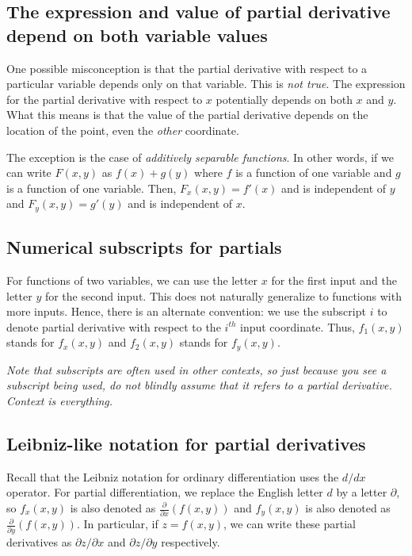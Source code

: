 \documentclass[10pt]{amsart}
\begin{document}
\subsection{The expression and value of partial derivative depend on both variable values}

One possible misconception is that the partial derivative with respect
to a particular variable depends only on that variable. This is {\em
not true}. The expression for the partial derivative with respect to
$x$ potentially depends on both $x$ and $y$. What this means is that
the value of the partial derivative depends on the location of the
point, even the {\em other} coordinate.

The exception is the case of {\em additively separable functions}. In
other words, if we can write $F(x,y)$ as $f(x) + g(y)$ where $f$ is a
function of one variable and $g$ is a function of one variable. Then,
$F_x(x,y) = f'(x)$ and is independent of $y$ and $F_y(x,y) = g'(y)$
and is independent of $x$.

\subsection{Numerical subscripts for partials}

For functions of two variables, we can use the letter $x$ for the
first input and the letter $y$ for the second input. This does not
naturally generalize to functions with more inputs. Hence, there is an
alternate convention: we use the subscript $i$ to denote partial
derivative with respect to the $i^{th}$ input coordinate. Thus,
$f_1(x,y)$ stands for $f_x(x,y)$ and $f_2(x,y)$ stands for $f_y(x,y)$.

{\em Note that subscripts are often used in other contexts, so just
because you see a subscript being used, do not blindly assume that it
refers to a partial derivative. Context is everything.}

\subsection{Leibniz-like notation for partial derivatives}

Recall that the Leibniz notation for ordinary differentiation uses the
$d/dx$ operator. For partial differentiation, we replace the English
letter $d$ by a letter $\partial$, so $f_x(x,y)$ is also denoted as
$\frac{\partial}{\partial x} (f(x,y))$ and $f_y(x,y)$ is also denoted
as $\frac{\partial}{\partial y} (f(x,y))$. In particular, if $z =
f(x,y)$, we can write these partial derivatives as $\partial
z/\partial x$ and $\partial z/\partial y$ respectively.
\end{document}
